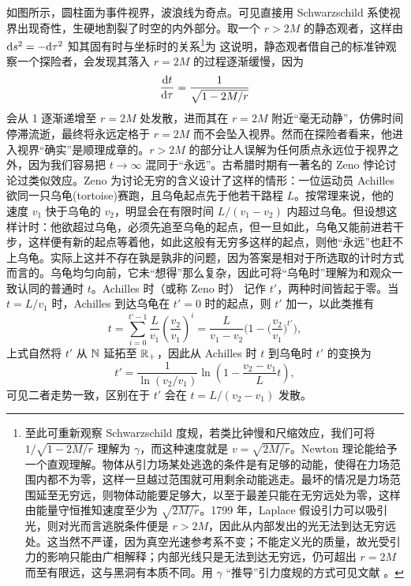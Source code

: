 如图所示，圆柱面为事件视界，波浪线为奇点。可见直接用 Schwarzschild 系使视界出现奇性，生硬地割裂了时空的内外部分。取一个 $r>2M$ 的静态观者，这样由 $\dd s^2=-\dd\tau^2$ 知其固有时与坐标时的关系\footnote{至此可重新观察 Schwarzschild 度规，若类比钟慢和尺缩效应，我们可将 $1/\sqrt{1-2M/r}$ 理解为 $\gamma$，而这种速度就是 $v=\sqrt{2M/r}$。Newton 理论能给予一个直观理解。物体从引力场某处逃逸的条件是有足够的动能，使得在力场范围内都不为零，这样一旦越过范围就可用剩余动能逃走。最坏的情况是力场范围延至无穷远，则物体动能要足够大，以至于最差只能在无穷远处为零，这样由能量守恒推知速度至少为 $\sqrt{2M/r}$。1799 年，Laplace 假设引力可以吸引光，则对光而言逃脱条件便是 $r>2M$，因此从内部发出的光无法到达无穷远处。这当然不严谨，因为真空光速参考系不变；不能定义光的质量，故光受引力的影响只能由广相解释；内部光线只是无法到达无穷远，仍可超出 $r=2M$ 而至有限远，这与黑洞有本质不同。用 $\gamma$ “推导”引力度规的方式可见文献 \cite{Czerniawski}。}为
这说明，静态观者借自己的标准钟观察一个探险者，会发现其落入 $r=2M$ 的过程逐渐缓慢，因为
\[
\dv{t}{\tau}=\frac{1}{\sqrt{1-2M/r}}
\]
会从 1 逐渐递增至 $r=2M$ 处发散，进而其在 $r=2M$ 附近“毫无动静”，仿佛时间停滞流逝，最终将永远定格于 $r=2M$ 而不会坠入视界。然而在探险者看来，他进入视界“确实”是顺理成章的。$r>2M$ 的部分让人误解为任何质点永远位于视界之外，因为我们容易把 $t\to\infty$ 混同于“永远”。古希腊时期有一著名的 Zeno 悖论讨论过类似效应。Zeno 为讨论无穷的含义设计了这样的情形：一位运动员 Achilles 欲同一只乌龟(tortoise)赛跑，且乌龟起点先于他若干路程 $L$。按常理来说，他的速度 $v_1$ 快于乌龟的 $v_2$，明显会在有限时间 $L/(v_1-v_2)$ 内超过乌龟。但设想这样计时：他欲超过乌龟，必须先追至乌龟的起点，但一旦如此，乌龟又能前进若干步，这样便有新的起点等着他，如此这般有无穷多这样的起点，则他“永远”也赶不上乌龟。实际上这并不存在孰是孰非的问题，因为答案是相对于所选取的计时方式而言的。乌龟均匀向前，它未“想得”那么复杂，因此可将“乌龟时”理解为和观众一致认同的普通时 $t$。Achilles 时（或称 Zeno 时） 记作 $t'$，两种时间皆起于零。当 $t=L/v_1$ 时，Achilles 到达乌龟在 $t'=0$ 时的起点，则 $t'$ 加一，以此类推有
\[
t=\sum_{i=0}^{t'-1} \frac{L}{v_1}\left(\frac{v_2}{v_1}\right)^{i}=\frac{L}{v_1-v_2}\bigg(1-\bigg(\frac{v_2}{v_1}\bigg)^{t'}\bigg),
\]
上式自然将 $t'$ 从 $\mathbb{N}$ 延拓至 $\mathbb{R}_+$，因此从 Achilles 时 $t$ 到乌龟时 $t'$ 的变换为
\[
t'=\frac{1}{\ln(v_2/v_1)}\ln\left(1-\frac{v_2-v_1}{L}t\right),
\]
可见二者走势一致，区别在于 $t'$ 会在 $t=L/(v_2-v_1)$ 发散。



